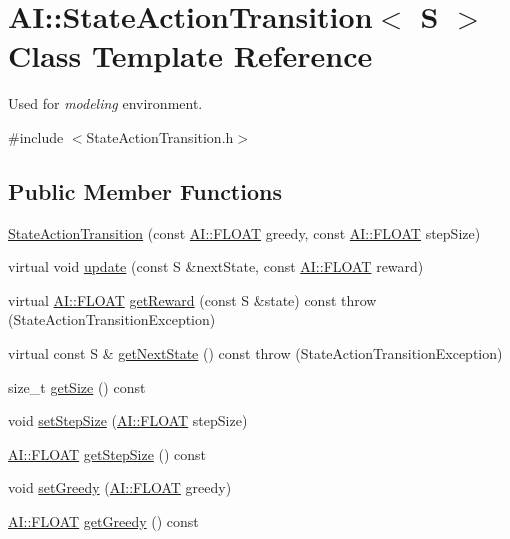 \hypertarget{classAI_1_1StateActionTransition}{\section{A\-I\-:\-:State\-Action\-Transition$<$ S $>$ Class Template Reference}
\label{classAI_1_1StateActionTransition}
}


Used for {\itshape modeling} environment.  




{\ttfamily \#include $<$State\-Action\-Transition.\-h$>$}

\subsection*{Public Member Functions}
\begin{DoxyCompactItemize}
\item 
\hyperlink{classAI_1_1StateActionTransition_a7c70bec4af58688f1e85d7c7d9a3b019}{State\-Action\-Transition} (const \hyperlink{namespaceAI_a41b74884a20833db653dded3918e05c3}{A\-I\-::\-F\-L\-O\-A\-T} greedy, const \hyperlink{namespaceAI_a41b74884a20833db653dded3918e05c3}{A\-I\-::\-F\-L\-O\-A\-T} step\-Size)
\item 
virtual void \hyperlink{classAI_1_1StateActionTransition_aaf4a3e41cfbc11aa2b55a9c24ecc06ba}{update} (const S \&next\-State, const \hyperlink{namespaceAI_a41b74884a20833db653dded3918e05c3}{A\-I\-::\-F\-L\-O\-A\-T} reward)
\item 
virtual \hyperlink{namespaceAI_a41b74884a20833db653dded3918e05c3}{A\-I\-::\-F\-L\-O\-A\-T} \hyperlink{classAI_1_1StateActionTransition_aae9fe3f86d32f5ff131a57cffe51ce47}{get\-Reward} (const S \&state) const   throw (\-State\-Action\-Transition\-Exception)
\item 
virtual const S \& \hyperlink{classAI_1_1StateActionTransition_a05acc3ceeb885f9096a3a3462f83a0d5}{get\-Next\-State} () const   throw (\-State\-Action\-Transition\-Exception)
\item 
size\-\_\-t \hyperlink{classAI_1_1StateActionTransition_a3e518acacf20af127b9226bdb1ac887f}{get\-Size} () const 
\item 
void \hyperlink{classAI_1_1StateActionTransition_a150cdd5fc4b6ec63c31ec59008241ce2}{set\-Step\-Size} (\hyperlink{namespaceAI_a41b74884a20833db653dded3918e05c3}{A\-I\-::\-F\-L\-O\-A\-T} step\-Size)
\item 
\hyperlink{namespaceAI_a41b74884a20833db653dded3918e05c3}{A\-I\-::\-F\-L\-O\-A\-T} \hyperlink{classAI_1_1StateActionTransition_a8f785662b6b21607ca356dd3aa06f345}{get\-Step\-Size} () const 
\item 
void \hyperlink{classAI_1_1StateActionTransition_ac6b371a119dc22ecaa5cf53981c01317}{set\-Greedy} (\hyperlink{namespaceAI_a41b74884a20833db653dded3918e05c3}{A\-I\-::\-F\-L\-O\-A\-T} greedy)
\item 
\hyperlink{namespaceAI_a41b74884a20833db653dded3918e05c3}{A\-I\-::\-F\-L\-O\-A\-T} \hyperlink{classAI_1_1StateActionTransition_aec72b991f0d32d122b830d086a3615c0}{get\-Greedy} () const 
\end{DoxyCompactItemize}


